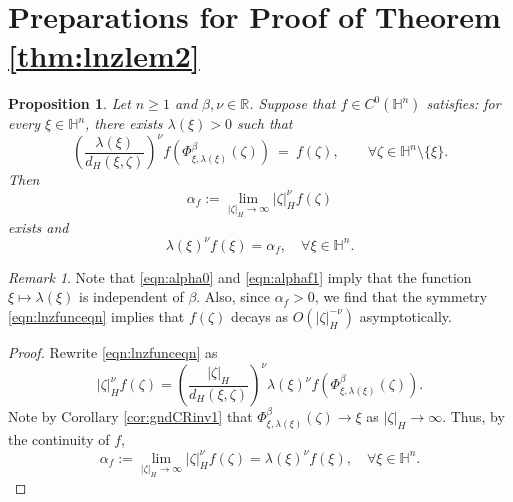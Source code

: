 \documentclass[reqno]{amsart}
\newtheorem{prop}[thm]{Proposition}
\theoremstyle{definition}
\theoremstyle{remark}
\newtheorem{rem}[thm]{Remark}
\numberwithin{equation}{section}
\begin{document}
\section{Preparations for Proof of Theorem \ref{thm:lnzlem2}}
\label{sec:prePfofLNZ2}

\begin{prop}\label{pro:lnzlem2}
Let $n \geq 1$ and $\beta, \nu \in \mathbb{R}$. Suppose that $f \in C^{0}(\mathbb{H}^{n})$ satisfies: for every $\xi \in \mathbb{H}^{n}$, there exists $\lambda(\xi)>0$ such that
\begin{equation}\label{eqn:lnzfunceqn}
\left(\frac{\lambda(\xi)}{d_{\! H} \!\left(\xi,\zeta\right)}\right)^{\nu} f\left(\Phi_{\xi,\lambda(\xi)}^{\beta}(\zeta)\right) 
~=~ f(\zeta), \qquad \forall \zeta \in \mathbb{H}^{n}\setminus\{\xi\}.
\end{equation}
Then 
\begin{equation}\label{eqn:alpha0}
\alpha_f :=\lim _{|\zeta|_{\! H} \rightarrow \infty} |\zeta|_{\! H}^{\nu} f(\zeta) 
\end{equation}
exists and
\begin{equation}\label{eqn:alphaf1}
\lambda(\xi)^{\nu} f(\xi) = \alpha_f, \quad \forall \xi \in \mathbb{H}^{n} . 
\end{equation}
\end{prop}

\begin{rem}\label{rmk:lnzlem2}
Note that \eqref{eqn:alpha0} and \eqref{eqn:alphaf1} imply that the function $\xi \mapsto \lambda(\xi)$ is independent of $\beta$. Also, since $\alpha_f>0$, we find that the symmetry \eqref{eqn:lnzfunceqn} implies 
that $f(\zeta)$ decays as $O(|\zeta|_{\! H}^{-\nu})$ asymptotically. 

\end{rem}

\begin{proof}
Rewrite \eqref{eqn:lnzfunceqn} as
\begin{equation}\label{eqn:lnzfunceqn2}
|\zeta|_{\! H}^{\nu} f(\zeta) = \left(\frac{|\zeta|_{\! H}}{d_{\! H}\! \left(\xi,\zeta\right)}\right)^{\nu} 
\lambda(\xi)^{\nu} f\left(\Phi_{\xi,\lambda(\xi)}^{\beta}(\zeta)\right). 
\end{equation}
Note by Corollary \ref{cor:gndCRinv1} that $\Phi_{\xi,\lambda(\xi)}^{\beta} (\zeta) \to \xi$ as $|\zeta|_{\! H}\to \infty$. Thus, by the continuity of $f$,
\begin{equation}
\alpha_f:=\lim _{|\zeta|_{\! H} \rightarrow \infty} |\zeta|_{\! H}^{\nu} f(\zeta) =\lambda(\xi)^{\nu} f(\xi), \quad \forall \xi \in \mathbb{H}^{n}.
\end{equation}
\end{proof}
\end{document}
